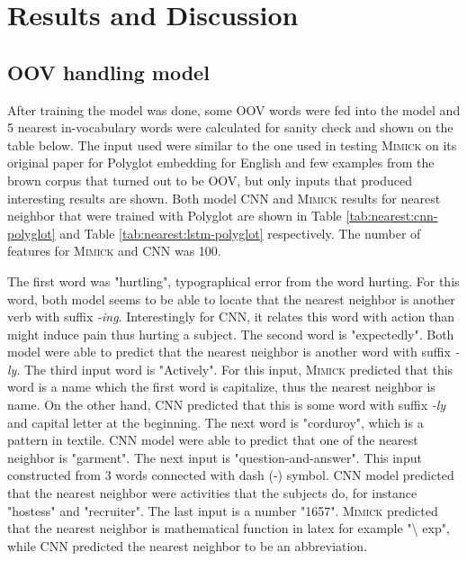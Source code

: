 \chapter{Results and Discussion}
\label{chap:results}
    \section{OOV handling model}
        After training the model was done, some OOV words were fed
        into the model and 5 nearest in-vocabulary words were
        calculated for sanity check and shown on the table below. The
        input used were similar to the one used in testing
        \textsc{Mimick} on its original paper for Polyglot embedding
        for English and few examples from the brown corpus that turned
        out to be OOV, but only inputs that produced interesting
        results are shown. Both model CNN and \textsc{Mimick} results
        for nearest neighbor that were trained with Polyglot are shown
        in Table \ref{tab:nearest:cnn-polyglot} and Table
        \ref{tab:nearest:lstm-polyglot} respectively. The number of
        features for \textsc{Mimick} and CNN was 100.

        The first word was "hurtling", typographical error from the
        word hurting. For this word, both model seems to be able to
        locate that the nearest neighbor is another verb with suffix
        \textit{-ing}. Interestingly for CNN, it relates this word
        with action than might induce pain thus hurting a subject. The
        second word is "expectedly". Both model were able to predict
        that the nearest neighbor is another word with suffix
        \textit{-ly}. The third input word is "Actively". For this
        input, \textsc{Mimick} predicted that this word is a name
        which the first word is capitalize, thus the nearest neighbor
        is name. On the other hand, CNN predicted that this is some
        word with suffix \textit{-ly} and capital letter at the
        beginning. The next word is "corduroy", which is a pattern in
        textile. CNN model were able to predict that one of the
        nearest neighbor is "garment". The next input is
        "question-and-answer". This input constructed from 3 words
        connected with dash (-) symbol. CNN model predicted that the
        nearest neighbor were activities that the subjects do, for
        instance "hostess" and "recruiter". The last input is a number
        "1657". \textsc{Mimick} predicted that the nearest neighbor is
        mathematical function in latex for example "\textbackslash
        exp", while CNN predicted the nearest neighbor to be an
        abbreviation.

